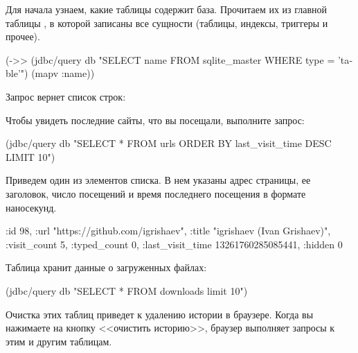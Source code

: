 Для начала узнаем, какие таблицы содержит база. Прочитаем их из главной таблицы , в которой записаны все сущности (таблицы, индексы, триггеры и прочее).

\begin{english}
  \begin{clojure}
(->> (jdbc/query db "SELECT name FROM sqlite_master
                     WHERE type = 'table'")
     (mapv :name))
  \end{clojure}
\end{english}

Запрос вернет список строк:

\begin{english}
  \begin{clojure}
  \end{clojure}
\end{english}

Чтобы увидеть последние сайты, что вы посещали, выполните запрос:

\begin{english}
  \begin{clojure}
(jdbc/query db
  "SELECT * FROM urls
   ORDER BY last_visit_time DESC LIMIT 10")
  \end{clojure}
\end{english}

Приведем один из элементов списка. В нем указаны адрес страницы, ее заголовок, число посещений и время последнего посещения в формате наносекунд.

\begin{english}
  \begin{clojure}
{:id 98,
 :url "https://github.com/igrishaev",
 :title "igrishaev (Ivan Grishaev)",
 :visit_count 5,
 :typed_count 0,
 :last_visit_time 13261760285085441,
 :hidden 0}
  \end{clojure}
\end{english}

Таблица  хранит данные о загруженных файлах:

\begin{english}
  \begin{clojure}
(jdbc/query db "SELECT * FROM downloads limit 10")
  \end{clojure}
\end{english}

Очистка этих таблиц приведет к удалению истории в браузере. Когда вы нажимаете на кнопку <<очистить историю>>, браузер выполняет запросы  к этим и другим таблицам.

